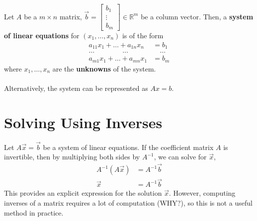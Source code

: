 \documentclass[letterpaper,12pt]{article}
\begin{document}
\begin{definition}
Let $A$ be a $m \times n$ matrix, $\vec{b} = \begin{bmatrix} b_1 \\ \vdots \\ b_m \end{bmatrix} \in \mathbb{R}^m$ be a column vector. Then, a \textbf{system of linear equations} for $(x_1, \dots, x_n)$ is of the form
\begin{align*}
    a_{11}x_1 + \dots + a_{1n}x_n & = b_1 \\
    \dots \qquad \qquad \dots \quad & \quad \dots \\
    a_{m1}x_1 + \dots + a_{mn}x_1 & = b_m
\end{align*}
where $x_1, \dots, x_n$ are the \textbf{unknowns} of the system.
\\ \\ Alternatively, the system can be represented as $Ax = b$.
\end{definition}

\section*{Solving Using Inverses}
Let $A\vec{x} = \vec{b}$ be a system of linear equations. If the coefficient matrix $A$ is invertible, then by multiplying both sides by $A^{-1}$, we can solve for $\vec{x}$,
\begin{align*}
    A^{-1}(A \vec{x}) & = A^{-1} \vec{b} \\
    \vec{x} & = A^{-1} \vec{b}
\end{align*}
This provides an explicit expression for the solution $\vec{x}$. However, computing inverses of a matrix requires a lot of computation (WHY?), so this is not a useful method in practice.
\end{document}
